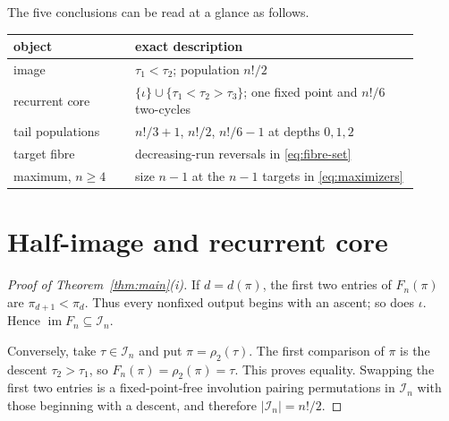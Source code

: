 \documentclass[a4paper,10pt]{amsart}
\theoremstyle{remark}
\newcommand{\cI}{\mathcal I}
\begin{document}
The five conclusions can be read at a glance as follows.
\begin{center}
\small
\begin{tabular}{>{\raggedright\arraybackslash}p{0.27\linewidth}
                >{\raggedright\arraybackslash}p{0.63\linewidth}}
\toprule
object & exact description \\
\midrule
image & $\tau_1<\tau_2$; population $n!/2$ \\
recurrent core & $\{\iota\}\cup\{\tau_1<\tau_2>\tau_3\}$; one fixed point and $n!/6$ two-cycles \\
tail populations & $n!/3+1$, $n!/2$, $n!/6-1$ at depths $0,1,2$ \\
target fibre & decreasing-run reversals in \eqref{eq:fibre-set} \\
maximum, $n\ge4$ & size $n-1$ at the $n-1$ targets in \eqref{eq:maximizers} \\
\bottomrule
\end{tabular}
\end{center}

\section{Half-image and recurrent core}

\begin{proof}[Proof of Theorem~\ref{thm:main}(i)]
If $d=d(\pi)$, the first two entries of $F_n(\pi)$ are
$\pi_{d+1}<\pi_d$.  Thus every nonfixed output begins with an ascent; so
does $\iota$.  Hence $\operatorname{im}F_n\subseteq\cI_n$.

Conversely, take $\tau\in\cI_n$ and put $\pi=\rho_2(\tau)$.  The first
comparison of $\pi$ is the descent $\tau_2>\tau_1$, so
$F_n(\pi)=\rho_2(\pi)=\tau$.  This proves equality.  Swapping the first two
entries is a fixed-point-free involution pairing permutations in $\cI_n$
with those beginning with a descent, and therefore $|\cI_n|=n!/2$.
\end{proof}
\end{document}
